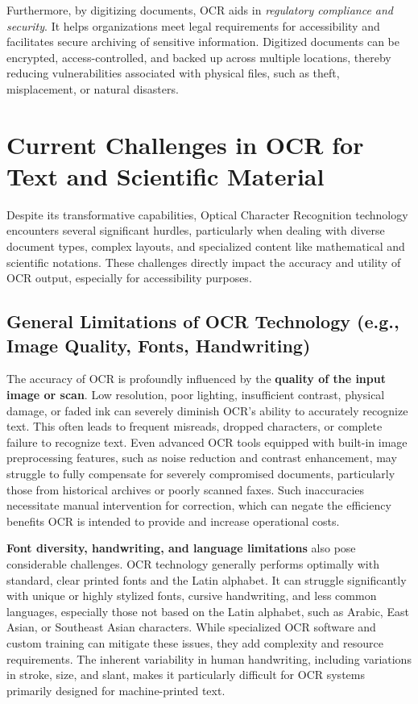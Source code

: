 Furthermore, by digitizing documents, OCR aids in \emph{regulatory compliance and security}. It helps organizations meet legal requirements for accessibility and facilitates secure archiving of sensitive information. Digitized documents can be encrypted, access-controlled, and backed up across multiple locations, thereby reducing vulnerabilities associated with physical files, such as theft, misplacement, or natural disasters. \cite{ContinualEngineOCR,DigitalDefyndOCR}

\section{Current Challenges in OCR for Text and Scientific Material}
\label{sec:ocr-challenges}

Despite its transformative capabilities, Optical Character Recognition technology encounters several significant hurdles, particularly when dealing with diverse document types, complex layouts, and specialized content like mathematical and scientific notations. These challenges directly impact the accuracy and utility of OCR output, especially for accessibility purposes.

\subsection{General Limitations of OCR Technology (e.g., Image Quality, Fonts, Handwriting)}

The accuracy of OCR is profoundly influenced by the \textbf{quality of the input image or scan}. Low resolution, poor lighting, insufficient contrast, physical damage, or faded ink can severely diminish OCR's ability to accurately recognize text. This often leads to frequent misreads, dropped characters, or complete failure to recognize text. \cite{DocuclipperLimitations,DigitalDefyndOCR} Even advanced OCR tools equipped with built-in image preprocessing features, such as noise reduction and contrast enhancement, may struggle to fully compensate for severely compromised documents, particularly those from historical archives or poorly scanned faxes. \cite{DigitalDefyndOCR} Such inaccuracies necessitate manual intervention for correction, which can negate the efficiency benefits OCR is intended to provide and increase operational costs. \cite{DigitalDefyndOCR}

\textbf{Font diversity, handwriting, and language limitations} also pose considerable challenges. OCR technology generally performs optimally with standard, clear printed fonts and the Latin alphabet. \cite{DocuclipperLimitations,KoncileTesseract} It can struggle significantly with unique or highly stylized fonts, cursive handwriting, and less common languages, especially those not based on the Latin alphabet, such as Arabic, East Asian, or Southeast Asian characters. \cite{DocuclipperLimitations,KoncileTesseract} While specialized OCR software and custom training can mitigate these issues, they add complexity and resource requirements. \cite{DocuclipperLimitations} The inherent variability in human handwriting, including variations in stroke, size, and slant, makes it particularly difficult for OCR systems primarily designed for machine-printed text. \cite{KoncileTesseract,DocuclipperLimitations}

